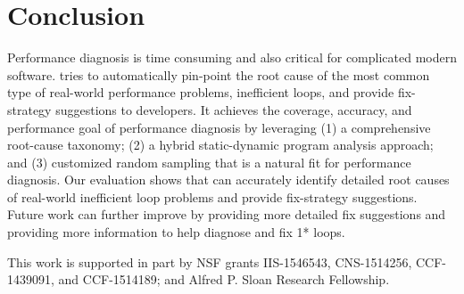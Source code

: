 \section{Conclusion}
\label{sec:con}
Performance diagnosis is time consuming and also critical for 
complicated modern software. \Tool tries to automatically 
pin-point the root cause of
the most common type of real-world performance problems, inefficient loops,
and provide fix-strategy suggestions to developers. It achieves the 
coverage, accuracy, and performance goal of performance diagnosis by leveraging
(1) a comprehensive root-cause taxonomy; (2) a hybrid static-dynamic program
analysis approach; and (3) customized random sampling that is a natural fit for 
performance diagnosis.
Our evaluation shows that \Tool can accurately identify detailed root causes
of real-world inefficient loop problems and provide fix-strategy suggestions. 
Future work can further improve \Tool by providing more detailed fix
suggestions and providing more information to help diagnose and fix
1* loops.


\acks
This work is supported in part by NSF grants IIS-1546543, CNS-1514256, CCF-1439091, and CCF-1514189; 
and Alfred P. Sloan Research Fellowship.
